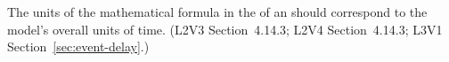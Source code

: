 The units of the mathematical formula in the  of an \Event
should correspond to the model's overall units of time.  (L2V3
Section~4.14.3; L2V4 Section~4.14.3; L3V1 Section~\ref{sec:event-delay}.)
